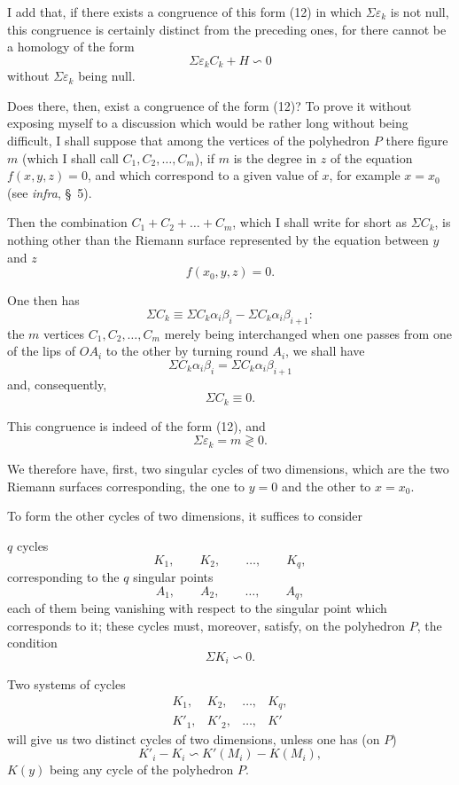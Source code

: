 \documentclass{article}
\begin{document}

I add that, if there exists a congruence of this form (12) in which $\Sigma \varepsilon_{k}$ is not null, this congruence is certainly distinct from the preceding ones, for there cannot be a homology of the form
\[ \Sigma \varepsilon_{k} C_{k} + H \backsim 0 \tag{13} \]
without $\Sigma \varepsilon_{k}$ being null.

Does there, then, exist a congruence of the form (12)? To prove it without exposing myself to a discussion which would be rather long without being difficult, I shall suppose that among the vertices of the polyhedron $P$ there figure $m$ (which I shall call $C_{1}, C_{2}, \ldots, C_{m}$), if $m$ is the degree in $z$ of the equation $f(x, y, z) = 0$, and which correspond to a given value of $x$, for example $x = x_{0}$ (see \emph{infra}, \S~5).

Then the combination $C_{1} + C_{2} + \ldots + C_{m}$, which I shall write for short as $\Sigma C_{k}$, is nothing other than the Riemann surface represented by the equation between $y$ and $z$
\[ f(x_{0}, y, z) = 0. \]

One then has
\[ \Sigma C_{k} \equiv \Sigma C_{k} \alpha_{i}\beta_{i} - \Sigma C_{k} \alpha_{i}\beta_{i+1}: \]
the $m$ vertices $C_{1}, C_{2}, \ldots, C_{m}$ merely being interchanged when one passes from one of the lips of $OA_{i}$ to the other by turning round $A_{i}$, we shall have
\[ \Sigma C_{k} \alpha_{i}\beta_{i} = \Sigma C_{k} \alpha_{i}\beta_{i+1} \]
and, consequently,
\[ \Sigma C_{k} \equiv 0. \]

This congruence is indeed of the form (12), and
\[ \Sigma \varepsilon_{k} = m \gtrless 0. \]

We therefore have, first, two singular cycles of two dimensions, which are the two Riemann surfaces corresponding, the one to $y = 0$ and the other to $x = x_{0}$.

To form the other cycles of two dimensions, it suffices to consider

$q$ cycles
\[ K_{1}, \qquad K_{2}, \qquad \ldots, \qquad K_{q}, \]
corresponding to the $q$ singular points
\[ A_{1}, \qquad A_{2}, \qquad \ldots, \qquad A_{q}, \]
each of them being vanishing with respect to the singular point which corresponds to it; these cycles must, moreover, satisfy, on the polyhedron $P$, the condition
\[ \Sigma K_{i} \backsim 0. \]

Two systems of cycles
\[ \begin{matrix} K_{1}, & K_{2}, & \ldots, & K_{q}, \\[1ex] K'_{1}, & K'_{2}, & \ldots, & K' \end{matrix} \]
will give us two distinct cycles of two dimensions, unless one has (on $P$)
\[ K'_{i} - K_{i} \backsim K'(M_{i}) - K(M_{i}), \]
$K(y)$ being any cycle of the polyhedron $P$.
\end{document}
